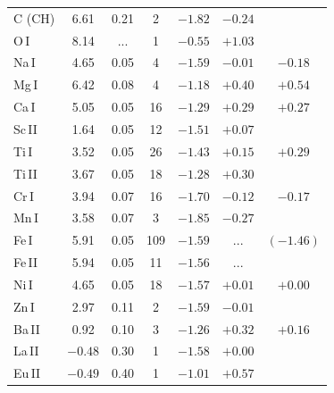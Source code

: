 \documentclass[manuscript]{aastex}
\begin{document}
\begin{table}
\begin{center}
{\begin{tabular}{l c c c c c c }
C (CH) &   6.61     &  0.21   &   2    &    $ -1.82 $  &  $ -0.24 $  &                \\
O\,I   &   8.14     &  ...        &   1    &    $ -0.55 $  &  $+ 1.03 $  &                \\
Na\,I  &   4.65     &  0.05   &   4    &    $ -1.59 $  &  $ -0.01 $  &  $ -0.18   $   \\       
Mg\,I  &   6.42     &  0.08   &   4    &    $ -1.18 $  &  $ +0.40 $  &  $ +0.54   $   \\       
Ca\,I  &   5.05     &  0.05   &   16   &    $ -1.29 $  &  $ +0.29 $  &  $ +0.27   $   \\       
Sc\,II &   1.64     &  0.05   &   12   &    $ -1.51 $  &  $ +0.07 $  &  $         $   \\       
Ti\,I  &   3.52     &  0.05   &   26   &    $ -1.43 $  &  $ +0.15 $  &  $ +0.29   $   \\       
Ti\,II &   3.67     &  0.05   &   18   &    $ -1.28 $  &  $ +0.30 $  &  $         $   \\       
Cr\,I  &   3.94     &  0.07   &   16   &    $ -1.70 $  &  $ -0.12 $  &  $ -0.17   $   \\       
Mn\,I  &   3.58     &  0.07   &   3    &    $ -1.85 $  &  $ -0.27 $  &  $         $   \\       
Fe\,I  &   5.91     &  0.05   &   109  &    $ -1.59 $  &  $ ...   $  &  $ (-1.46) $   \\       
Fe\,II &   5.94     &  0.05   &   11   &    $ -1.56 $  &  $ ...   $  &  $         $   \\       
Ni\,I  &   4.65     &  0.05   &   18   &    $ -1.57 $  &  $ +0.01 $  &  $ +0.00   $   \\  
Zn\,I  &   2.97     &  0.11   &   2    &    $ -1.59 $  &  $ -0.01 $  &  $         $   \\     
Ba\,II &   0.92     &  0.10   &   3    &    $ -1.26 $  &  $ +0.32 $  &  $ +0.16   $   \\
La\,II &   $-0.48$  &  0.30   &   1    &    $ -1.58 $  &  $ +0.00 $  &                \\
Eu\,II & $ -0.4 9$  &  0.40   &   1    &    $ -1.01 $  &  $ +0.57 $  &                \\  \hline

  \end{tabular}}
 \end{center}
\end{table}



\end{document}
